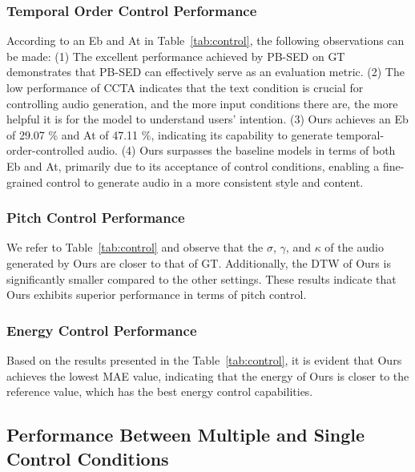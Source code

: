 \documentclass[letterpaper]{article} %
\begin{document}
\subsubsection{Temporal Order Control Performance} According to an Eb and At in Table~\ref{tab:control}, the following observations can be made: (1) The excellent performance achieved by PB-SED on GT demonstrates that PB-SED can effectively serve as an evaluation metric. (2) The low performance of CCTA indicates that the text condition is crucial for controlling audio generation, and the more input conditions there are, the more helpful it is for the model to understand users' intention. (3) Ours achieves an Eb of 29.07 \% and At of 47.11 \%, indicating its capability to generate temporal-order-controlled audio. (4) Ours surpasses the baseline models in terms of both Eb and At, primarily due to its acceptance of control conditions, enabling a fine-grained control to generate audio in a more consistent style and content.

\subsubsection{Pitch Control Performance} We refer to Table~\ref{tab:control} and observe that the $\sigma$, $\gamma$, and $\kappa$ of the audio generated by Ours are closer to that of GT. Additionally, the DTW of Ours is significantly smaller compared to the other settings. These results indicate that Ours exhibits superior performance in terms of pitch control.

\subsubsection{Energy Control Performance} Based on the results presented in the Table~\ref{tab:control}, it is evident that Ours achieves the lowest MAE value, indicating that the energy of Ours is closer to the reference value, which has the best energy control capabilities.

\subsection{Performance Between Multiple and Single Control Conditions}
\end{document}
